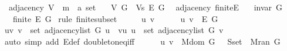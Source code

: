 \begin{isabellebody}
\isanewline
{}\isamarkupfalse%
\ {\isacharparenleft}{\kern0pt}\ adjacency{\isacharparenright}{\kern0pt}\ V\ {\isacharcolon}{\kern0pt}{\isacharcolon}{\kern0pt}\ {\isachardoublequoteopen}{\isacharprime}{\kern0pt}m\ {\isasymRightarrow}\ {\isacharprime}{\kern0pt}a\ set{\isachardoublequoteclose}\ \isanewline
\ \ {\isachardoublequoteopen}V\ G\ {\isasymequiv}\ Vs\ {\isacharparenleft}{\kern0pt}E\ G{\isacharparenright}{\kern0pt}{\isachardoublequoteclose}\isanewline
\isanewline
{}\isamarkupfalse%
\ {\isacharparenleft}{\kern0pt}\ adjacency{\isacharparenright}{\kern0pt}\ finite{\isacharunderscore}{\kern0pt}E{\isacharcolon}{\kern0pt}\isanewline
\ \ \ {\isachardoublequoteopen}invar\ G{\isachardoublequoteclose}\isanewline
\ \ \ {\isachardoublequoteopen}finite\ {\isacharparenleft}{\kern0pt}E\ G{\isacharparenright}{\kern0pt}{\isachardoublequoteclose}\isanewline
%
\isadelimproof
%
\endisadelimproof
%
\isatagproof
{}\isamarkupfalse%
\ {\isacharparenleft}{\kern0pt}rule\ finite{\isacharunderscore}{\kern0pt}subset{\isacharparenright}{\kern0pt}\isanewline
\ \ \isacommand{{\isacharbraceleft}{\kern0pt}}\isamarkupfalse%
\ \isamarkupfalse%
\ u\ v\isanewline
\ \ \ \ \isamarkupfalse%
\ {\isachardoublequoteopen}{\isacharbraceleft}{\kern0pt}u{\isacharcomma}{\kern0pt}\ v{\isacharbraceright}{\kern0pt}\ {\isasymin}\ E\ G{\isachardoublequoteclose}\isanewline
\ \ \ \ \isamarkupfalse%
\ \isamarkupfalse%
\ {\isacharparenleft}{\kern0pt}u{\isacharunderscore}{\kern0pt}v{\isacharparenright}{\kern0pt}\ {\isachardoublequoteopen}v\ {\isasymin}\ set\ {\isacharparenleft}{\kern0pt}adjacency{\isacharunderscore}{\kern0pt}list\ G\ u{\isacharparenright}{\kern0pt}{\isachardoublequoteclose}\ {\isacharbar}{\kern0pt}\ {\isacharparenleft}{\kern0pt}v{\isacharunderscore}{\kern0pt}u{\isacharparenright}{\kern0pt}\ {\isachardoublequoteopen}u\ {\isasymin}\ set\ {\isacharparenleft}{\kern0pt}adjacency{\isacharunderscore}{\kern0pt}list\ G\ v{\isacharparenright}{\kern0pt}{\isachardoublequoteclose}\isanewline
\ \ \ \ \ \ \isamarkupfalse%
\ {\isacharparenleft}{\kern0pt}auto\ simp\ add{\isacharcolon}{\kern0pt}\ E{\isacharunderscore}{\kern0pt}def\ doubleton{\isacharunderscore}{\kern0pt}eq{\isacharunderscore}{\kern0pt}iff{\isacharparenright}{\kern0pt}\isanewline
\ \ \ \ \isamarkupfalse%
\ {\isachardoublequoteopen}{\isacharbraceleft}{\kern0pt}u{\isacharcomma}{\kern0pt}\ v{\isacharbraceright}{\kern0pt}\ {\isasymsubseteq}\ M{\isachardot}{\kern0pt}dom\ G\ {\isasymunion}\ {\isasymUnion}\ {\isacharparenleft}{\kern0pt}S{\isachardot}{\kern0pt}set\ {\isacharbackquote}{\kern0pt}\ M{\isachardot}{\kern0pt}ran\ G{\isacharparenright}{\kern0pt}{\isachardoublequoteclose}\isanewline

\end{isabellebody}
